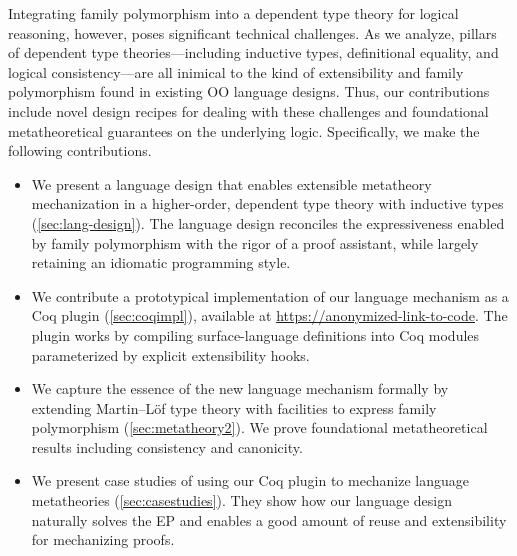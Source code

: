 Integrating family polymorphism into a dependent type theory for
logical reasoning, however, poses significant technical challenges.
As we analyze, pillars of dependent type theories—including
inductive types, definitional equality, and logical consistency—are
all inimical to the kind of extensibility and family polymorphism
found in existing OO language designs.
Thus, our contributions include novel design recipes for dealing with
these challenges and foundational meta\-theoretical guarantees on the
underlying logic.
%
Specifically, we make the following contributions.

\endgroup

\begin{itemize}%
    [labelsep=*,leftmargin=1pc,itemsep=3pt]

\item We present a
language design that enables extensible
metatheory mechanization in a higher-order, dependent type theory with
inductive types (\cref{sec:lang-design}).
The language design reconciles the expressiveness enabled by
family polymorphism with the rigor of a proof assistant,
while largely retaining an idiomatic programming style.

\item We contribute a prototypical implementation of our language
mechanism as a Coq plugin (\cref{sec:coqimpl}),
available at \url{https://anonymized-link-to-code}.
The plugin works by
compiling surface-language definitions into Coq modules parameterized by
explicit extensibility hooks.

\item We capture the essence of the new language mechanism formally by extending
Martin–Löf type theory with facilities to express family polymorphism (\cref{sec:metatheory2}).
We prove foundational meta\-theoretical results including consistency
and canonicity.

\item We present case studies of using our Coq plugin to mechanize
language metatheories (\cref{sec:casestudies}).
They show how our language design naturally solves the EP and
enables a good amount of reuse and extensibility
for mechanizing proofs.

\end{itemize}

